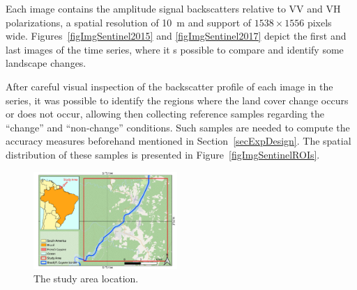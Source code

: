 \documentclass[journal]{IEEEtran}
\begin{document}
Each image contains the amplitude signal backscatters relative to VV and VH polarizations, a spatial resolution of \SI{10}{\meter} and support of $1538 \times 1556$ pixels wide.
Figures~\ref{figImgSentinel2015} and \ref{figImgSentinel2017} depict the first and last images of the time series, where it s possible to compare and identify some landscape changes.

After careful visual inspection of the backscatter profile of each image in the series, it was possible to identify the regions where the land cover change occurs or does not occur, allowing then collecting reference samples regarding the ``change'' and ``non-change'' conditions. 
Such samples are needed to compute the accuracy measures beforehand mentioned in Section~\ref{secExpDesign}. The spatial distribution of these samples is presented in Figure~\ref{figImgSentinelROIs}.


\begin{figure}[hbt]
\centering
\includegraphics[width=0.485\textwidth]{../../qgis/maps/StudyArea_OSM.pdf}
\caption{The study area location.}\label{figAE}
\end{figure}
\end{document}
